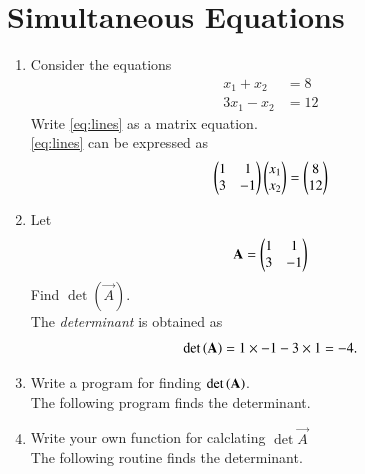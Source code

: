 \documentclass[journal,12pt,twocolumn]{IEEEtran}
\renewcommand\thesection{\arabic{section}}
\begin{document}
\section{Simultaneous Equations}
\begin{enumerate}[label=\thesection.\arabic*
,ref=\thesection.\theenumi]
%
\item Consider the equations
\begin{align}
\label{eq:lines}
 x_1 +x_2&=8
\\
 3x_1 -x_2&=12
\end{align}
Write \eqref{eq:lines} as a matrix equation.
\\
\solution \eqref{eq:lines} can be expressed as
\begin{align}
\label{eq:matrix}
\begin{pmatrix}1 & 1 \\ 3 & -1\end{pmatrix}\begin{pmatrix}x_1 \\x_2\end{pmatrix} = \begin{pmatrix}8 \\12\end{pmatrix}
\end{align}
\item Let 
\begin{align}
\label{eq:matrix_det}
\mathbf{A}= \begin{pmatrix}1 & 1 \\ 3 & -1\end{pmatrix}
\end{align}
Find $\det(\vec{A})$.
\\
\solution The {\em determinant} is obtained as
\begin{equation}
\det\left(\mathbf{A}\right) = 1 \times -1 - 3 \times 1 = -4.
\end{equation}
%
\item Write a program for finding $\det\left(\mathbf{A}\right)$.
\\
\solution The following program finds the determinant.

\item Write your own function for calclating $\det{\vec{A}}$
\\
\solution The following routine finds the determinant.




\end{enumerate}
\end{document}
